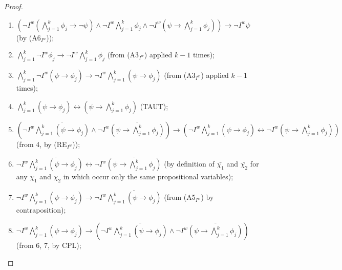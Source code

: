 \documentclass{article}
\begin{document}
\begin{proof}

\

\begin{enumerate}

\item $(\neg I^{w} (\bigwedge^{k}_{j=1} \phi_{j} \rightarrow \neg \psi) \wedge \neg I^{w}\bigwedge^{k}_{j=1} \phi_{j}  \wedge \neg I^{w}(\psi \rightarrow \bigwedge^{k}_{j=1} \phi_{j} )) \rightarrow \neg I^{w} \psi$ (by (A6$_{I^{w}}$));

\item $\bigwedge^{k}_{j=1} \neg I^{w} \phi_{j} \rightarrow \neg I^{w} \bigwedge^{k}_{j=1} \phi_{j}$ (from (A3$_{I^{w}}$) applied $k - 1$ times);

\item $\bigwedge^{k}_{j=1} \neg I^{w}(\psi \rightarrow \phi_{j}) \rightarrow \neg I^{w} \bigwedge^{k}_{j=1} (\psi \rightarrow \phi_{j})$ (from (A3$_{I^{w}}$) applied $k-1$ times);

\item $\bigwedge^{k}_{j=1} (\psi \rightarrow \phi_{j}) \leftrightarrow (\psi \rightarrow \bigwedge^{k}_{j=1} \phi_{j})$ (TAUT);

\item $(\neg I^{w} \overline{\bigwedge^{k}_{j=1} (\psi \rightarrow \phi_{j})} \wedge \neg I^{w} \overline{(\psi \rightarrow \bigwedge^{k}_{j=1} \phi_{j})}) \rightarrow (\neg I^{w} \bigwedge^{k}_{j=1} (\psi \rightarrow \phi_{j}) \leftrightarrow \neg I^{w} (\psi \rightarrow \bigwedge^{k}_{j=1} \phi_{j}))$ (from 4, by (RE$_{I^{w}}$));

\item $\neg I^{w} \overline{\bigwedge^{k}_{j=1} (\psi \rightarrow \phi_{j})} \leftrightarrow \neg I^{w} \overline{(\psi \rightarrow \bigwedge^{k}_{j=1} \phi_{j})}$ (by definition of $\bar{\chi_{1}}$ and $\bar{\chi_{2}}$ for any $\chi_{1}$ and $\chi_{2}$ in which occur only the same propositional variables);

\item $\neg I^{w} \bigwedge^{k}_{j=1} (\psi \rightarrow \phi_{j}) \rightarrow \neg I^{w} \overline{\bigwedge^{k}_{j=1} (\psi \rightarrow \phi_{j})}$ (from (A5$_{I^{w}}$) by contraposition);

\item $\neg I^{w} \bigwedge^{k}_{j=1} (\psi \rightarrow \phi_{j}) \rightarrow (\neg I^{w} \overline{\bigwedge^{k}_{j=1} (\psi \rightarrow \phi_{j})} \wedge \neg I^{w} \overline{(\psi \rightarrow \bigwedge^{k}_{j=1} \phi_{j})})$ (from 6, 7, by CPL);
 


\end{enumerate}
\end{proof}
\end{document}
